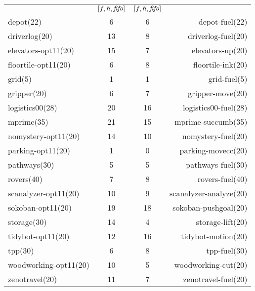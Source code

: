 \begin{center}
\begin{tabular}{|lc|cr|}
 & \([f,h,{\text{\textit{fifo}}}]\) & \([f,h,{\text{\textit{fifo}}}]\) & \\
depot(22) & 6 & 6 & depot-fuel(22)\\
driverlog(20) & 13 & 8 & driverlog-fuel(20)\\
elevators-opt11(20) & 15 & 7 & elevators-up(20)\\
floortile-opt11(20) & 6 & 8 & floortile-ink(20)\\
grid(5) & 1 & 1 & grid-fuel(5)\\
gripper(20) & 6 & 7 & gripper-move(20)\\
logistics00(28) & 20 & 16 & logistics00-fuel(28)\\
mprime(35) & 21 & 15 & mprime-succumb(35)\\
nomystery-opt11(20) & 14 & 10 & nomystery-fuel(20)\\
parking-opt11(20) & 1 & 0 & parking-movecc(20)\\
pathways(30) & 5 & 5 & pathways-fuel(30)\\
rovers(40) & 7 & 8 & rovers-fuel(40)\\
scanalyzer-opt11(20) & 10 & 9 & scanalyzer-analyze(20)\\
sokoban-opt11(20) & 19 & 18 & sokoban-pushgoal(20)\\
storage(30) & 14 & 4 & storage-lift(20)\\
tidybot-opt11(20) & 12 & 16 & tidybot-motion(20)\\
tpp(30) & 6 & 8 & tpp-fuel(30)\\
woodworking-opt11(20) & 10 & 5 & woodworking-cut(20)\\
zenotravel(20) & 11 & 7 & zenotravel-fuel(20)\\
\end{tabular}
\end{center}
